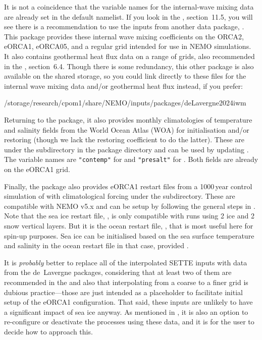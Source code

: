 It is not a coincidence that the variable names for the internal-wave mixing data are already set in the default namelist.
If you look in the , section~11.5, you will see there is a recommendation to use the inputs from another data package, \citet{delavergne2024iwm}.
This package provides these internal wave mixing coefficients on the ORCA2, eORCA1, eORCA05, and a regular grid intended for use in NEMO simulations.
It also contains geothermal heat flux data on a range of grids, also recommended in the , section~6.4.
Though there is some redundancy, this other package is also available on the shared storage, so you could link directly to these files for the internal wave mixing data and/or geothermal heat flux instead, if you prefer:

\begingroup\small
\begin{VerbatimFile}
/storage/research/cpom1/share/NEMO/inputs/packages/deLavergne2024iwm
\end{VerbatimFile}
\endgroup

Returning to the \citet{delavergne2024eorca1} package, it also provides monthly climatologies of temperature and salinity fields from the World Ocean Atlas (WOA) for initialisation and/or restoring (though we lack the restoring coefficient to do the latter).
These are under the  subdirectory in the \linebreak{} package directory and can be used by updating .
The variable names are \texttt{"contemp"} for  and \texttt{"presalt"} for .
Both fields are already on the eORCA1 grid.

Finally, the package also provides eORCA1 restart files from a 1000\,year control simulation of \NEMOSIcu{} with climatological forcing under the  subdirectory.
These are compatible with NEMO v5.x and can be setup by following the general steps in .
Note that the sea ice restart file, , is only compatible with runs using 2 ice and 2 snow vertical layers.
But it is the ocean restart file, , that is most useful here for spin-up purposes.
Sea ice can be initialised based on the sea surface temperature and salinity in the ocean restart file in that case, provided .

It is \textit{probably} better to replace all of the interpolated SETTE inputs with data from the de~Lavergne packages, considering that at least two of them are recommended in the  and also that interpolating from a coarse to a finer grid is dubious practice---those are just intended as a placeholder to facilitate initial setup of the eORCA1 configuration.
That said, these inputs are unlikely to have a significant impact of sea ice anyway.
As mentioned in , it is also an option to re-configure or deactivate the processes using these data, and it is for the user to decide how to approach this.


